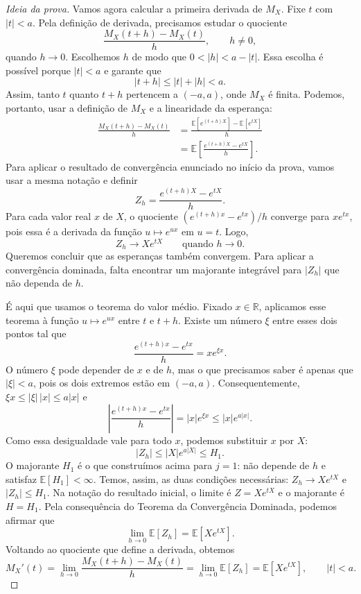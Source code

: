 \documentclass[12pt,portuguese]{article}
\theoremstyle{definition}
\theoremstyle{plainexercise}
\theoremstyle{starredexercise}
\theoremstyle{definition}
\begin{document}
\begin{proof}[Ideia da prova]
Vamos agora calcular a primeira derivada de $M_X$. Fixe $t$ com $|t|<a$.
Pela definição de derivada, precisamos estudar o quociente
\[
\frac{M_X(t+h)-M_X(t)}{h},\qquad h\neq0,
\]
quando $h\to0$. Escolhemos $h$ de modo que $0<|h|<a-|t|$.
Essa escolha é possível porque $|t|<a$ e garante que
\[
|t+h|\leqslant |t|+|h|<a.
\]
Assim, tanto $t$ quanto $t+h$ pertencem a $(-a,a)$, onde $M_X$ é finita.
Podemos, portanto, usar a definição de $M_X$ e a linearidade da esperança:
\begin{align*}
\frac{M_X(t+h)-M_X(t)}{h}
&=\frac{\mathbb{E}[e^{(t+h)X}]-\mathbb{E}[e^{tX}]}{h}
\\[0.3cm]
&=\mathbb{E}\left[\frac{e^{(t+h)X}-e^{tX}}{h}\right].
\end{align*}
Para aplicar o resultado de convergência enunciado no início da prova,
vamos usar a mesma notação e definir
\[
Z_h=\frac{e^{(t+h)X}-e^{tX}}{h}.
\]
Para cada valor real $x$ de $X$, o quociente
$(e^{(t+h)x}-e^{tx})/h$ converge para $xe^{tx}$, pois essa
é a derivada da função $u\mapsto e^{ux}$ em $u=t$. Logo,
\[
Z_h\longrightarrow Xe^{tX}\qquad\text{quando }h\to0.
\]
Queremos concluir que as esperanças também convergem. Para aplicar
a convergência dominada, falta encontrar um majorante integrável para
$|Z_h|$ que não dependa de $h$.

É aqui que usamos o teorema do valor médio. Fixado $x\in\mathbb{R}$,
aplicamos esse teorema à função $u\mapsto e^{ux}$ entre $t$ e $t+h$.
Existe um número $\xi$ entre esses dois pontos tal que
\[
\frac{e^{(t+h)x}-e^{tx}}{h}=xe^{\xi x}.
\]
O número $\xi$ pode depender de $x$ e de $h$, mas o que precisamos
saber é apenas que $|\xi|<a$, pois os dois extremos estão em $(-a,a)$.
Consequentemente, $\xi x\leqslant |\xi|\,|x|\leqslant a|x|$ e
\[
\left|\frac{e^{(t+h)x}-e^{tx}}{h}\right|
=|x|e^{\xi x}
\leqslant |x|e^{a|x|}.
\]
Como essa desigualdade vale para todo $x$, podemos substituir $x$ por $X$:
\begin{equation}\label{eq:fgm-majorante-quociente}
|Z_h|\leqslant |X|e^{a|X|}\leqslant H_1.
\end{equation}
O majorante $H_1$ é o que construímos acima para $j=1$: não depende
de $h$ e satisfaz $\mathbb{E}[H_1]<\infty$. Temos, assim, as duas
condições necessárias: $Z_h\to Xe^{tX}$ e $|Z_h|\leqslant H_1$.
Na notação do resultado inicial, o limite é $Z=Xe^{tX}$ e o majorante
é $H=H_1$. Pela consequência do Teorema da Convergência Dominada, podemos afirmar que
\[
\lim_{h\to0}\mathbb{E}[Z_h]=\mathbb{E}[Xe^{tX}].
\]
Voltando ao quociente que define a derivada, obtemos
\[
M_X'(t)
=\lim_{h\to0}\frac{M_X(t+h)-M_X(t)}{h}
=\lim_{h\to0}\mathbb{E}[Z_h]
=\mathbb{E}[Xe^{tX}],\qquad |t|<a.
\]


\end{proof}
\end{document}
